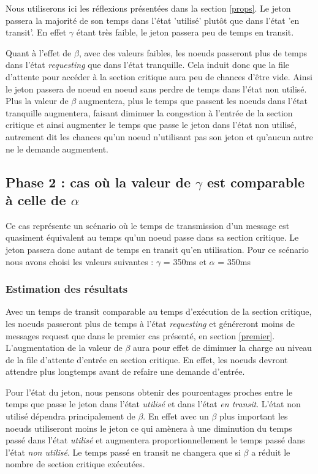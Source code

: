 \documentclass[12pt,a4paper]{article}
\begin{document}
Nous utiliserons ici les réflexions présentées dans la section \ref{props}. Le jeton passera la majorité de son temps dans l'état 'utilisé' plutôt que dans l'état 'en transit'. En effet $\gamma$ étant très faible, le jeton passera peu de temps en transit. 

Quant à l'effet de $\beta$, avec des valeurs faibles, les noeuds passeront plus de temps dans l'état \textit{requesting} que dans l'état tranquille. Cela induit donc que la file d'attente pour accéder à la section critique aura peu de chances d'être vide. Ainsi le jeton passera de noeud en noeud sans perdre de temps dans l'état non utilisé. 
Plus la valeur de $\beta$ augmentera, plus le temps que passent les noeuds dans l'état tranquille augmentera, faisant diminuer la congestion à l'entrée de la section critique et ainsi augmenter le temps que passe le jeton dans l'état non utilisé, autrement dit les chances qu'un noeud n'utilisant pas son jeton et qu'aucun autre ne le demande augmentent.

\subsection{Phase 2 : cas où la valeur de $\gamma$ est comparable à celle de $\alpha$ \label{deuxieme}}
Ce cas représente un scénario où le temps de transmission d’un message est quasiment équivalent au temps qu'un noeud passe dans sa section critique. Le jeton passera donc autant de temps en transit qu'en utilisation. Pour ce scénario nous avons choisi les valeurs suivantes : $\gamma$ = 350ms et $\alpha$ = 350ms

\subsubsection{Estimation des résultats}

Avec un temps de transit comparable au temps d'exécution de la section critique, les noeuds passeront plus de temps à l'état \textit{requesting} et généreront moins de messages request que dans le premier cas présenté, en section \ref{premier}. L'augmentation de la valeur de $\beta$ aura pour effet de diminuer la charge au niveau de la file d'attente d'entrée en section critique. En effet, les noeuds devront attendre plus longtemps avant de refaire une demande d'entrée.

Pour l'état du jeton, nous pensons obtenir des pourcentages proches entre le temps que passe le jeton dans l'état \textit{utilisé} et dans l'état \textit{en transit}. L'état non utilisé dépendra principalement de $\beta$. En effet avec un $\beta$ plus important les noeuds utiliseront moins le jeton ce qui amènera à une diminution du temps passé dans l'état \textit{utilisé} et augmentera proportionnellement le temps passé dans l'état \textit{non utilisé}. Le temps passé en transit ne changera que si $\beta$ a réduit le nombre de section critique exécutées.
\end{document}
